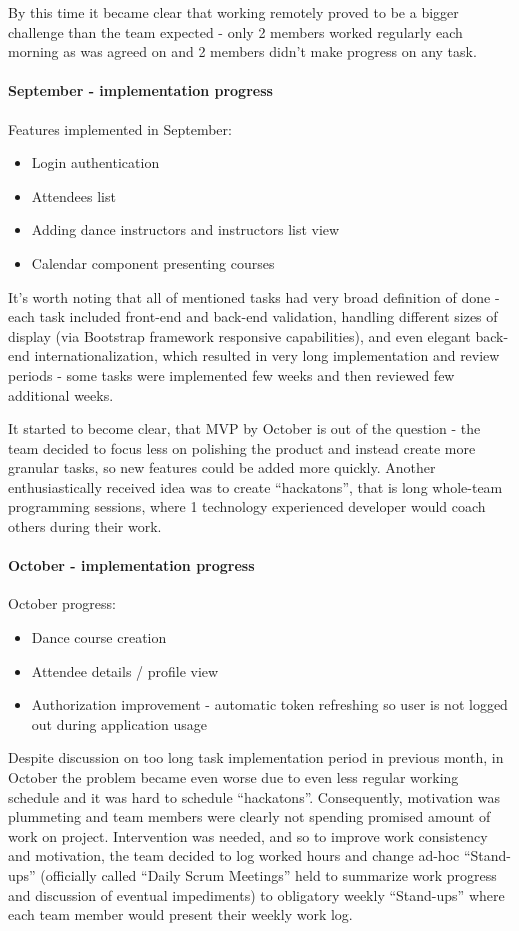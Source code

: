 \documentclass{article}
\begin{document}
By this time it became clear that working remotely proved to be a bigger challenge than the team expected - only 2 members worked regularly each morning as was agreed on and 2 members didn't make progress on any task.

\paragraph{September - implementation progress}
Features implemented in September:
\begin{itemize}
\item Login authentication
\item Attendees list
\item Adding dance instructors and instructors list view
\item Calendar component presenting courses
\end{itemize}
It's worth noting that all of mentioned tasks had very broad definition of done - each task included front-end and back-end validation, handling different sizes of display (via Bootstrap framework responsive capabilities), and even elegant back-end internationalization, which resulted in very long implementation and review periods - some tasks were implemented few weeks and then reviewed few additional weeks.

It started to become clear, that MVP by October is out of the question - the team decided to focus less on polishing the product and instead create more granular tasks, so new features could be added more quickly. Another enthusiastically received idea was to create ``hackatons'', that is long whole-team programming sessions, where 1 technology experienced developer would coach others during their work.

\paragraph{October - implementation progress}
October progress:
\begin{itemize}
\item Dance course creation
\item Attendee details / profile view
\item Authorization improvement - automatic token refreshing so user is not logged out during application usage
\end{itemize}

Despite discussion on too long task implementation period in previous month, in October the problem became even worse due to even less regular working schedule and it was hard to schedule ``hackatons''. Consequently, motivation was plummeting and team members were clearly not spending promised amount of work on project. Intervention was needed, and so to improve work consistency and motivation, the team decided to log worked hours and change ad-hoc ``Stand-ups'' (officially called ``Daily Scrum Meetings'' held to summarize work progress and discussion of eventual impediments) to obligatory weekly ``Stand-ups'' where each team member would present their weekly work log.
\end{document}
